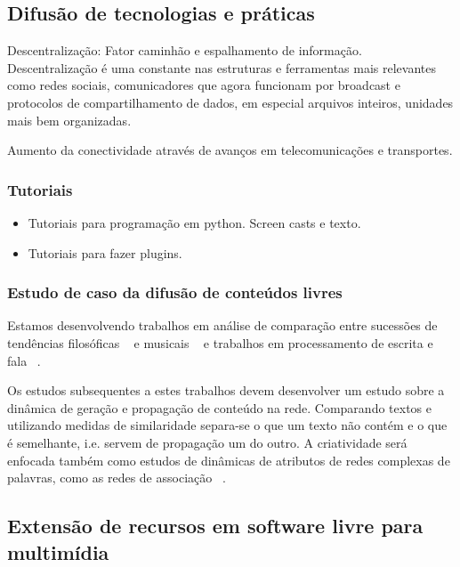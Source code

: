   \subsection{Difusão de tecnologias e práticas}
  \label{sec:tutoriais}
Descentralização: Fator caminhão e espalhamento de informação. Descentralização
é uma constante nas estruturas e ferramentas mais relevantes como redes
sociais, comunicadores que agora funcionam por broadcast e protocolos de
compartilhamento de dados, em especial arquivos inteiros, unidades mais
bem organizadas.

Aumento da conectividade através de avanços em telecomunicações e transportes.

    \subsubsection{Tutoriais}
    \label{sec:uso_sl}

\begin{itemize}
    \item Tutoriais para programação em python.
Screen casts e texto.

    \item Tutoriais para fazer plugins.
\end{itemize}

    \subsubsection{Estudo de caso da difusão de conteúdos livres}
    \label{sec:dif_sl}
Estamos desenvolvendo trabalhos em análise de comparação
entre sucessões de tendências filosóficas ~\cite{philome} e
musicais ~\cite{musime} e trabalhos em processamento de escrita
e fala ~\cite{rede-associacoes, complenet, enfmc, ifsc}.

Os estudos subsequentes a estes trabalhos devem desenvolver
um estudo sobre a dinâmica de geração e propagação de conteúdo na rede.
Comparando textos e utilizando medidas de similaridade separa-se
o que um texto não contém e o que é semelhante, i.e. servem de propagação
um do outro. A criatividade será enfocada também como estudos de dinâmicas
de atributos de redes complexas de palavras, como as redes de associação ~\cite{rede-associacoes}.


  \subsection{Extensão de recursos em software livre para multimídia}
  \label{sec:extensao}

